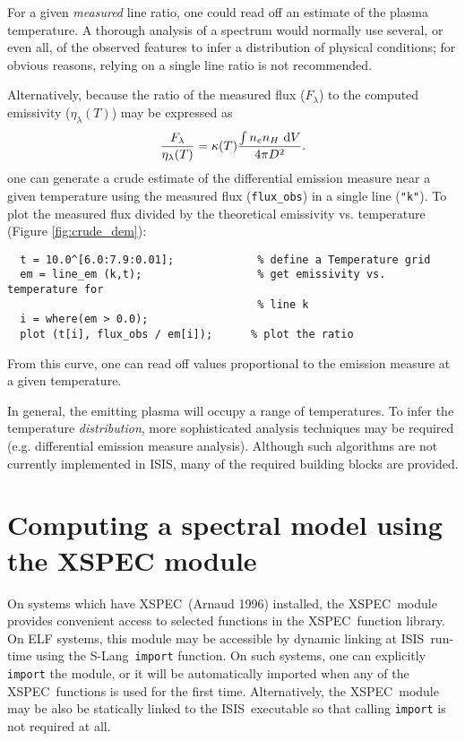 \documentclass{book}
\newcommand{\D}{{\rm d}}
\newcommand{\isisx}{{\sc ISIS~}}
\newcommand{\isis}{{\sc ISIS}}
\newcommand{\slang}{{\sc S-Lang}}
\newcommand{\xspec}{{\sc XSPEC}}
\begin{document}
For a given {\it measured} line ratio, one could read off an estimate of the
plasma temperature.  A thorough analysis of a spectrum would normally use
several, or even all, of the observed features to infer a distribution of
physical conditions; for obvious reasons, relying on a single line ratio is
not recommended.

Alternatively, because the ratio of the measured flux ($F_\lambda$) to the
computed emissivity ($\eta_\lambda(T)$) may be expressed as
\begin{equation}
{ F_\lambda \over \eta_\lambda(T) } = \kappa(T) { \int n_e
n_H~\D V \over 4\pi D^2 }.
\end{equation}
one can generate a crude estimate of the differential emission measure near a
given temperature using the measured flux ({\tt flux\_obs}) in a single line
({\tt "k"}). To plot the measured flux divided by the theoretical emissivity
vs. temperature (Figure \ref{fig:crude_dem}):
  \begin{verbatim}
  t = 10.0^[6.0:7.9:0.01];             % define a Temperature grid
  em = line_em (k,t);                  % get emissivity vs. temperature for
                                       % line k
  i = where(em > 0.0);
  plot (t[i], flux_obs / em[i]);      % plot the ratio
  \end{verbatim}
From this curve, one can read off values proportional to the emission
measure at a given temperature.

In general, the emitting plasma will occupy a range of temperatures.
To infer the temperature {\it distribution}, more sophisticated
analysis techniques may be required (e.g. differential emission
measure analysis). Although such algorithms are not currently
implemented in \isis, many of the required building blocks are
provided.

\section{Computing a spectral model using the XSPEC module}

On systems which have \xspec\ (Arnaud 1996) installed, the \xspec\
module provides convenient access to selected functions in the
\xspec\ function library.  On ELF systems, this module may be
accessible by dynamic linking at \isisx run-time using the \slang\
\verb|import| function. On such systems, one can explicitly
\verb|import| the module, or it will be automatically imported
when any of the \xspec\ functions is used for the first time.
Alternatively, the \xspec\ module may be also be statically linked
to the \isisx executable so that calling \verb|import| is not
required at all.
\end{document}
